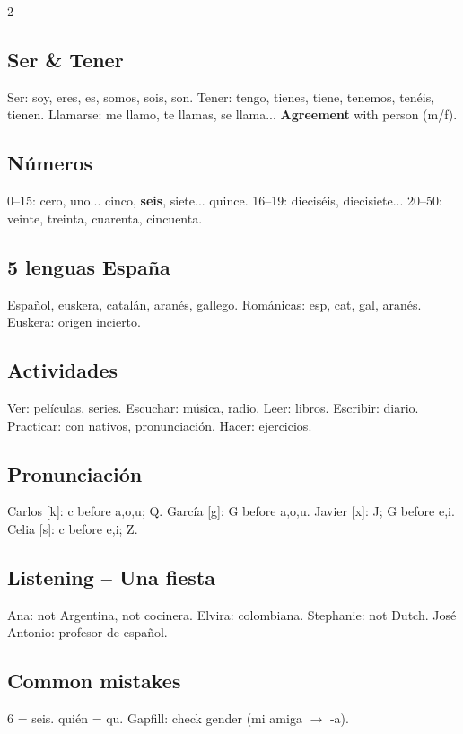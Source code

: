 \documentclass[10pt,landscape,a4paper]{article}
\begin{document}
\begin{multicols}{2}
\subsection*{\color{accent} Ser \& Tener}
Ser: soy, eres, es, somos, sois, son. Tener: tengo, tienes, tiene, tenemos, ten\'eis, tienen. Llamarse: me llamo, te llamas, se llama... \textbf{Agreement} with person (m/f).

\subsection*{\color{accent} N\'umeros}
0--15: cero, uno... cinco, \textbf{seis}, siete... quince. 16--19: diecis\'eis, diecisiete... 20--50: veinte, treinta, cuarenta, cincuenta.

\subsection*{\color{accent} 5 lenguas Espa\~na}
Espa\~nol, euskera, catal\'an, aran\'es, gallego. Rom\'anicas: esp, cat, gal, aran\'es. Euskera: origen incierto.

\subsection*{\color{accent} Actividades}
Ver: pel\'iculas, series. Escuchar: m\'usica, radio. Leer: libros. Escribir: diario. Practicar: con nativos, pronunciaci\'on. Hacer: ejercicios.

\subsection*{\color{accent} Pronunciaci\'on}
Carlos [k]: c before a,o,u; Q. Garc\'ia [g]: G before a,o,u. Javier [x]: J; G before e,i. Celia [s]: c before e,i; Z.

\subsection*{\color{accent} Listening -- Una fiesta}
Ana: not Argentina, not cocinera. Elvira: colombiana. Stephanie: not Dutch. Jos\'e Antonio: profesor de espa\~nol.

\subsection*{\color{accent} Common mistakes}
6 = seis. qui\'en = qu. Gapfill: check gender (mi amiga $\to$ -a).
\end{multicols}
\end{document}
